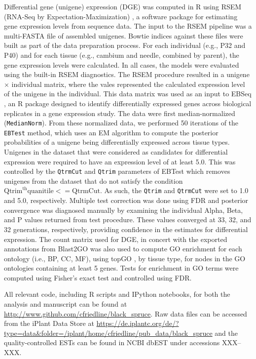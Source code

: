 \documentclass[11pt]{article}
\begin{document}
Differential gene (unigene) expression (DGE) was computed in R
\citep[v. 3.1.1]{R} using RSEM (RNA-Seq by Expectation-Maximization)
\citep[v. 1.2.15]{Li:BmcBioinformatics:2011}, a software package for estimating
gene expression levels from sequence data.  The input to the RSEM pipeline was a
multi-FASTA file of assembled unigenes.  Bowtie indices
\citep[v. 2.2.3]{Langmead:NatMethods:2012} against these files were built as
part of the data preparation process.  For each individual (e.g., P32 and P40)
and for each tissue (e.g., cambium and needle, combined by parent), the gene
expression levels were calculated. In all cases, the models were evaluated using
the built-in RSEM diagnostics.  The RSEM procedure resulted in a unigene
$\times$ individual matrix, where the vales represented the calculated
expression level of the unigene in the individual.  This data matrix was used as
an input to EBSeq \citep[v. 1.4.0]{Leng:Bioinformatics:2013}, an R package
designed to identify differentially expressed genes across biological replicates
in a gene expression study. The data were first median-normalized
(\texttt{MedianNorm}).  From these normalized data, we performed 50 iterations
of the \texttt{EBTest} method, which uses an EM algorithm to compute the
posterior probabilities of a unigene being differentially expressed across
tissue types. Unigenes in the dataset that were considered as candidates for
differential expression were required to have an expression level of at least
5.0.  This was controlled by the \texttt{QtrmCut} and \texttt{Qtrim} parameters
of EBTest which removes unigenes from the dataset that do not satisfy the
condition $\text{Qtrim}^{\text{th}} \text{quanitile} <= \text{QtrmCut}$.  As
such, the \texttt{Qtrim} and \texttt{QtrmCut} were set to 1.0 and 5.0,
respectively.  Multiple test correction was done using FDR
\citep{benjamini1995controlling} and posterior convergence was diagnosed
manually by examining the individual Alpha, Beta, and P values returned from
test procedure.  These values converged at 33, 32, and 32 generations,
respectively, providing confidence in the estimates for differential expression.
The count matrix used for DGE, in concert with the exported annotations from
Blast2GO was also used to compute GO enrichment for each ontology (i.e., BP, CC,
MF), using topGO \citep{topgo}, by tissue type, for nodes in the GO ontologies
containing at least 5 genes.  Tests for enrichment in GO terms were computed
using Fisher's exact test and controlled using FDR.

All relevant code, including R scripts and IPython notebooks, for both the
analysis and manuscript can be found at
\url{http://www.github.com/cfriedline/black_spruce}.  Raw data files can be
accessed from the iPlant Data Store at
\url{https://de.iplantc.org/de/?type=data&folder=/iplant/home/cfriedline/pub_data/black_spruce}
and the quality-controlled ESTs can be found in NCBI dbEST under accessions
XXX--XXX.
\end{document}
